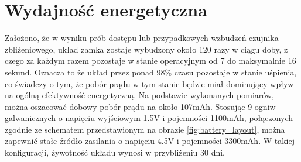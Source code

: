 


    \section{Wydajność energetyczna}

    Założono, że w wyniku prób dostępu lub przypadkowych wzbudzeń czujnika zbliżeniowego, układ zamka zostaje wybudzony około 120 razy w ciągu doby, z czego za każdym razem pozostaje w stanie operacyjnym od 7 do maksymalnie 16 sekund. Oznacza to że układ przez ponad 98\% czasu pozostaje w stanie uśpienia, co świadczy o tym, że pobór prądu w tym stanie będzie miał dominujący wpływ na ogólną efektywność energetyczną. Na podstawie wykonanych pomiarów, można oszacować dobowy pobór prądu na około 107mAh. Stosując 9  ogniw galwanicznych o napięciu wyjściowym 1.5V i pojemności 1100mAh, połączonych zgodnie ze schematem przedstawionym na obrazie \ref{fig:battery_layout}, można zapewnić stałe źródło zasilania o napięciu 4.5V i pojemności 3300mAh. W takiej konfiguracji, żywotność układu wynosi w przybliżeniu 30 dni.

